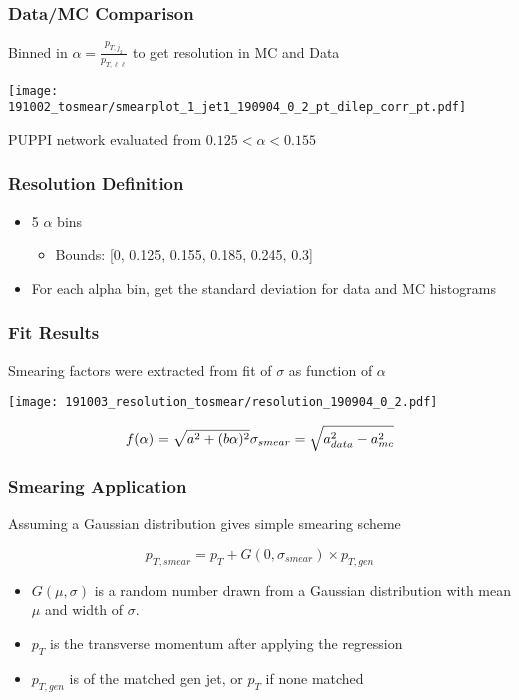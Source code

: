 \documentclass{beamer}
\begin{document}
\begin{frame}
  \frametitle{Data/MC Comparison}

  Binned in $\alpha = \frac{p_{T, j_2}}{p_{T, \ell\ell}}$
  to get resolution in MC and Data

  \centering
  \texttt{[image: 191002\_tosmear/smearplot\_1\_jet1\_190904\_0\_2\_pt\_dilep\_corr\_pt.pdf]}

  PUPPI network evaluated from $0.125 < \alpha < 0.155$

\end{frame}


\begin{frame}
  \frametitle{Resolution Definition}

  \begin{itemize}
  \item 5 $\alpha$ bins
    \begin{itemize}
    \item Bounds: [0, 0.125, 0.155, 0.185, 0.245, 0.3]
    \end{itemize}
  \item For each alpha bin, get the standard deviation for data and MC histograms
  \end{itemize}

\end{frame}


\begin{frame}
  \frametitle{Fit Results}

  Smearing factors were extracted from fit of $\sigma$ as function of $\alpha$

  \centering
  \vspace{12pt}
  \texttt{[image: 191003\_resolution\_tosmear/resolution\_190904\_0\_2.pdf]}

  \[
  f(\alpha) = \sqrt{a^2 + (b \alpha)^2} \\
  \sigma_{smear} = \sqrt{a^2_{data} - a^2_{mc}}
  \]

\end{frame}


\begin{frame}
  \frametitle{Smearing Application}

  Assuming a Gaussian distribution gives simple smearing scheme

  \[
  p_{T, smear} = p_T + G(0, \sigma_{smear}) \times p_{T, gen}
  \]

  \begin{itemize}
  \item $G(\mu, \sigma)$ is a random number drawn from a Gaussian distribution
    with mean $\mu$ and width of $\sigma$.
  \item $p_T$ is the transverse momentum after applying the regression
  \item $p_{T, gen}$ is of the matched gen jet, or $p_T$ if none matched
  \end{itemize}

\end{frame}
\end{document}
